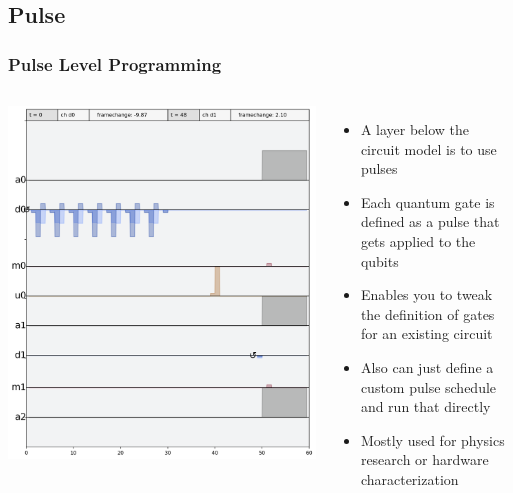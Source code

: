 \documentclass[aspectratio=169,11pt,hyperref={colorlinks=true}]{beamer}
\begin{document}
\subsection{Pulse}
\begin{frame}
    \frametitle{Pulse Level Programming}
    \begin{columns}
            \includegraphics[width=\textwidth]{bell-sched.png}
            \begin{itemize}
                \item A layer below the circuit model is to use pulses
                \item Each quantum gate is defined as a pulse that gets
                    applied to the qubits
                \item Enables you to tweak the definition of gates for an
                    existing circuit
                \item Also can just define a custom pulse schedule and
                    run that directly
                \item Mostly used for physics research or hardware characterization
            \end{itemize}
    \end{columns}
\end{frame}
\end{document}
